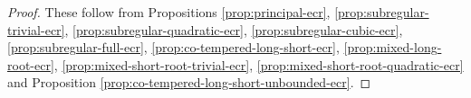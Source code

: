 \documentclass[12pt]{amsart}
\theoremstyle{definition}
\theoremstyle{plain}
\theoremstyle{remark}
\numberwithin{equation}{section}
\begin{document}
\begin{proof}
      These follow from Propositions \ref{prop:principal-ecr}, \ref{prop:subregular-trivial-ecr}, \ref{prop:subregular-quadratic-ecr}, \ref{prop:subregular-cubic-ecr}, \ref{prop:subregular-full-ecr}, \ref{prop:co-tempered-long-short-ecr}, \ref{prop:mixed-long-root-ecr}, \ref{prop:mixed-short-root-trivial-ecr}, \ref{prop:mixed-short-root-quadratic-ecr} and Proposition \ref{prop:co-tempered-long-short-unbounded-ecr}.
\end{proof}





\end{document}
